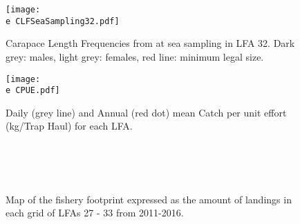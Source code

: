 \documentclass[11pt]{article}
\newcommand{\e}{\string~/bio.data/bio.lobster/figures/LFA2733Framework2018/} %
\begin{document}
    \begin{figure}
    \centering
        \texttt{[image: \\e CLFSeaSampling32.pdf]}
        \caption{Carapace Length Frequencies from at sea sampling in LFA 32. Dark grey: males, light grey: females, red line: minimum legal size.}

    \end{figure}



    \begin{figure}
    \centering
        \texttt{[image: \\e CPUE.pdf]}
        \caption{Daily (grey line) and Annual (red dot) mean Catch per unit effort (kg/Trap Haul) for each LFA.}

    \end{figure}

        \begin{figure}
        \centering
                \\
                \\
                \\
        
         \caption{Map of the fishery footprint expressed as the amount of landings in each grid of LFAs 27 - 33 from 2011-2016.}
        \end{figure}
\end{document}
